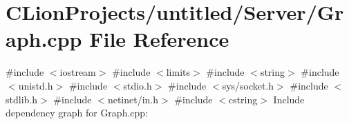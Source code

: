 \section{C\+Lion\+Projects/untitled/\+Server/\+Graph.cpp File Reference}
\label{_graph_8cpp}
{\ttfamily \#include $<$iostream$>$}\newline
{\ttfamily \#include $<$limits$>$}\newline
{\ttfamily \#include $<$string$>$}\newline
{\ttfamily \#include $<$unistd.\+h$>$}\newline
{\ttfamily \#include $<$stdio.\+h$>$}\newline
{\ttfamily \#include $<$sys/socket.\+h$>$}\newline
{\ttfamily \#include $<$stdlib.\+h$>$}\newline
{\ttfamily \#include $<$netinet/in.\+h$>$}\newline
{\ttfamily \#include $<$cstring$>$}\newline
Include dependency graph for Graph.\+cpp\+:
